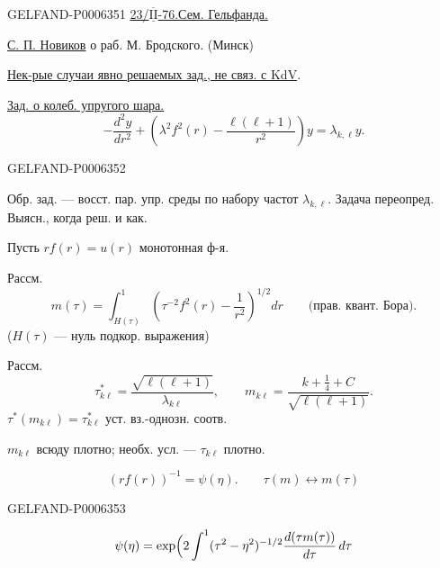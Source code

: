 \begin{GelfandAdjacentEvidence}{GELFAND-P000635}{1}
\underline{23/\(\overline{\underline{\mathrm{II}}}\)-76.}\qquad\underline{Сем. Гельфанда.}

\underline{С. П. Новиков} о раб. М. Бродского. (Минск)

\underline{Нек-рые случаи явно решаемых зад., не связ. с KdV}.

\underline{Зад. о колеб. упругого шара.}
\[
-\frac{d^2y}{dr^2}+
\left(\lambda^2f^2(r)-\frac{\ell(\ell+1)}{r^2}\right)y
=\lambda_{k,\ell}y.
\]
\end{GelfandAdjacentEvidence}
\begin{GelfandAdjacentEvidence}{GELFAND-P000635}{2}

Обр. зад. --- восст. пар. упр. среды по набору частот \(\lambda_{k,\ell}\).
Задача переопред. Выясн., когда реш. и как.

Пусть \(rf(r)=u(r)\) монотонная ф-я.

Рассм.
\[
m(\tau)=\int_{H(\tau)}^1
\left(\tau^{-2}f^2(r)-\frac1{r^2}\right)^{1/2}dr
\qquad\text{(прав. квант. Бора)}.
\]
(\(H(\tau)\) --- нуль подкор. выражения)

Рассм.
\[
\tau^*_{k\ell}=\frac{\sqrt{\ell(\ell+1)}}{\lambda_{k\ell}},\qquad
m_{k\ell}=\frac{k+\tfrac14+C}{\sqrt{\ell(\ell+1)}}.
\]
\(\tau^*(m_{k\ell})=\tau^*_{k\ell}\) уст. вз.-однозн. соотв.

\(m_{k\ell}\) всюду плотно;
необх. усл. --- \(\tau_{k\ell}\) плотно.

\[
(rf(r))^{-1}=\psi(\eta).\qquad \tau(m)\longleftrightarrow m(\tau)
\]
\end{GelfandAdjacentEvidence}
\begin{GelfandAdjacentEvidence}{GELFAND-P000635}{3}

\[
\psi(\eta)=\exp\Bigl(2\int^{1}(\tau^2-\eta^2)^{-1/2}
\frac{d(\tau m(\tau))}{d\tau}\,d\tau
\]
\end{GelfandAdjacentEvidence}
